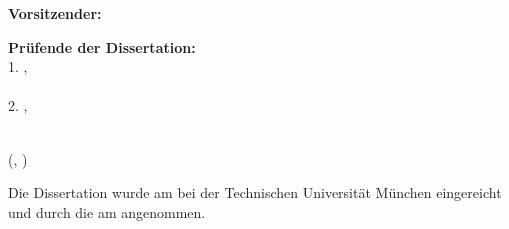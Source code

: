 \begin{titlepage}
\begin{textblock*}{}
        \textbf{Vorsitzender:}\\
        \hspace{8mm}\hphantom{1. } \chairman{}

        \vspace{2mm}

        \textbf{Pr\"ufende der Dissertation:}\\
        \hspace{8mm}1. \supervisorA{},\\
          \hspace{8mm}\hphantom{2. }\supervisorAuni{}\\
        \hspace{8mm}2. \supervisorB{}
          ,\\\hspace{8mm}\hphantom{2. }\supervisorBuni{}\\
%


    \end{textblock*}



    \begin{textblock*}{}(, \datevpos)
        \raggedright

        Die Dissertation wurde am \subdate{} bei der Technischen Universit\"at
        M\"unchen eingereicht und durch die {\facultyger{}}
          am \accdate{}
        angenommen.

    \end{textblock*}

\end{titlepage}

\mbox{}
\newpage
\thispagestyle{empty}
\mbox{}
\newpage

\thispagestyle{empty}

%
%
